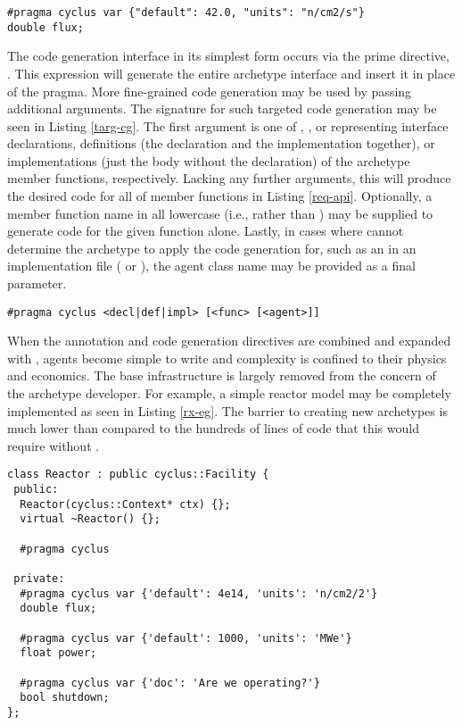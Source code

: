 \begin{lstlisting}[caption={Flux State Variable Annotation}, label=flux-pragma]
#pragma cyclus var {"default": 42.0, "units": "n/cm2/s"}
double flux;
\end{lstlisting}

The code generation interface in its simplest form occurs via the \cyclus 
prime directive, .  This expression will 
generate the entire archetype interface and insert it in place of the pragma.
More fine-grained code generation may be used by passing additional arguments.
The signature for such targeted code generation may be seen in Listing \ref{targ-cg}.
The first argument is one of , , or  representing 
interface declarations, definitions (the declaration and the implementation together), 
or implementations (just the body without the declaration) of the archetype member
functions, respectively. Lacking any further arguments, this will produce the desired code for 
all of member functions in Listing \ref{req-api}.  Optionally, a member function 
name in all lowercase (i.e.,  rather than ) may 
be supplied to generate code for the given function alone.  Lastly, in 
cases where \cycpp cannot determine the archetype to apply the code generation for,
such as an in an implementation file ( or ), the agent
class name may be provided as a final parameter.

\begin{lstlisting}[caption={Targeted Code Generation Directive Signatures}, 
                   label=targ-cg]
#pragma cyclus <decl|def|impl> [<func> [<agent>]]
\end{lstlisting}

When the annotation and code generation directives are combined and expanded with 
\cycpp, agents become simple to write and complexity is confined to their physics 
and economics. The base \cyclus
infrastructure is largely removed from the concern of the archetype developer.
For example, a simple reactor model may be completely implemented as seen in 
Listing \ref{rx-eg}. The barrier to creating new archetypes is much lower than 
compared to the hundreds of lines of code that this would require without \cycpp.

\begin{lstlisting}[caption={Simple Reactor Archetype}, label=rx-eg]
class Reactor : public cyclus::Facility {
 public:
  Reactor(cyclus::Context* ctx) {};
  virtual ~Reactor() {};

  #pragma cyclus

 private:
  #pragma cyclus var {'default': 4e14, 'units': 'n/cm2/2'}
  double flux;

  #pragma cyclus var {'default': 1000, 'units': 'MWe'}
  float power;

  #pragma cyclus var {'doc': 'Are we operating?'}
  bool shutdown;
};
\end{lstlisting}

